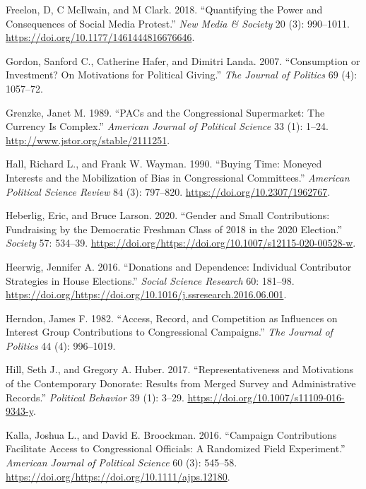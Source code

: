 \documentclass[12pt,]{article}
\begin{document}
\leavevmode\hypertarget{ref-freelon2018}{}%
Freelon, D, C McIlwain, and M Clark. 2018. ``Quantifying the Power and
Consequences of Social Media Protest.'' \emph{New Media \& Society} 20
(3): 990--1011. \url{https://doi.org/10.1177/1461444816676646}.

\leavevmode\hypertarget{ref-gordon2007}{}%
Gordon, Sanford C., Catherine Hafer, and Dimitri Landa. 2007.
``Consumption or Investment? On Motivations for Political Giving.''
\emph{The Journal of Politics} 69 (4): 1057--72.

\leavevmode\hypertarget{ref-grenzke1989}{}%
Grenzke, Janet M. 1989. ``PACs and the Congressional Supermarket: The
Currency Is Complex.'' \emph{American Journal of Political Science} 33
(1): 1--24. \url{http://www.jstor.org/stable/2111251}.

\leavevmode\hypertarget{ref-hall1990}{}%
Hall, Richard L., and Frank W. Wayman. 1990. ``Buying Time: Moneyed
Interests and the Mobilization of Bias in Congressional Committees.''
\emph{American Political Science Review} 84 (3): 797--820.
\url{https://doi.org/10.2307/1962767}.

\leavevmode\hypertarget{ref-heberlig2020}{}%
Heberlig, Eric, and Bruce Larson. 2020. ``Gender and Small
Contributions: Fundraising by the Democratic Freshman Class of 2018 in
the 2020 Election.'' \emph{Society} 57: 534--39.
\url{https://doi.org/https://doi.org/10.1007/s12115-020-00528-w}.

\leavevmode\hypertarget{ref-heerwig2016}{}%
Heerwig, Jennifer A. 2016. ``Donations and Dependence: Individual
Contributor Strategies in House Elections.'' \emph{Social Science
Research} 60: 181--98.
\url{https://doi.org/https://doi.org/10.1016/j.ssresearch.2016.06.001}.

\leavevmode\hypertarget{ref-herndon1982}{}%
Herndon, James F. 1982. ``Access, Record, and Competition as Influences
on Interest Group Contributions to Congressional Campaigns.'' \emph{The
Journal of Politics} 44 (4): 996--1019.

\leavevmode\hypertarget{ref-hill2017}{}%
Hill, Seth J., and Gregory A. Huber. 2017. ``Representativeness and
Motivations of the Contemporary Donorate: Results from Merged Survey and
Administrative Records.'' \emph{Political Behavior} 39 (1): 3--29.
\url{https://doi.org/10.1007/s11109-016-9343-y}.

\leavevmode\hypertarget{ref-kalla2015}{}%
Kalla, Joshua L., and David E. Broockman. 2016. ``Campaign Contributions
Facilitate Access to Congressional Officials: A Randomized Field
Experiment.'' \emph{American Journal of Political Science} 60 (3):
545--58. \url{https://doi.org/https://doi.org/10.1111/ajps.12180}.
\end{document}
